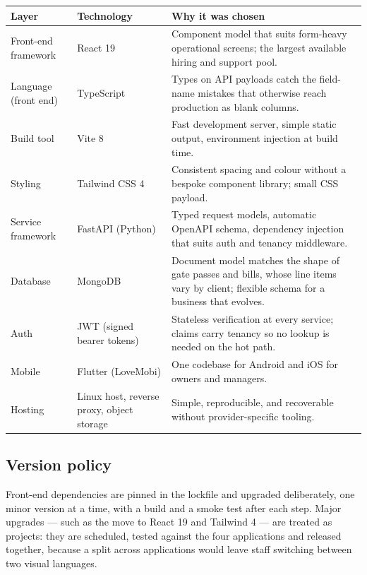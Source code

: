\documentclass[11pt,a4paper,oneside]{book}
\begin{document}
\begin{center}\small
\begin{tabularx}{\linewidth}{|X|X|X|}
\hline
\rowcolor{lightgrey}
\textbf{Layer} & \textbf{Technology} & \textbf{Why it was chosen} \\ \hline
Front-end framework & React 19 & Component model that suits form-heavy operational screens; the largest available hiring and support pool. \\ \hline
Language (front end) & TypeScript & Types on API payloads catch the field-name mistakes that otherwise reach production as blank columns. \\ \hline
Build tool & Vite 8 & Fast development server, simple static output, environment injection at build time. \\ \hline
Styling & Tailwind CSS 4 & Consistent spacing and colour without a bespoke component library; small CSS payload. \\ \hline
Service framework & FastAPI (Python) & Typed request models, automatic OpenAPI schema, dependency injection that suits auth and tenancy middleware. \\ \hline
Database & MongoDB & Document model matches the shape of gate passes and bills, whose line items vary by client; flexible schema for a business that evolves. \\ \hline
Auth & JWT (signed bearer tokens) & Stateless verification at every service; claims carry tenancy so no lookup is needed on the hot path. \\ \hline
Mobile & Flutter (LoveMobi) & One codebase for Android and iOS for owners and managers. \\ \hline
Hosting & Linux host, reverse proxy, object storage & Simple, reproducible, and recoverable without provider-specific tooling. \\ \hline
\end{tabularx}
\end{center}
\subsection*{Version policy}
Front-end dependencies are pinned in the lockfile and upgraded deliberately, one minor version at a time, with a build and a smoke test after each step. Major upgrades — such as the move to React 19 and Tailwind 4 — are treated as projects: they are scheduled, tested against the four applications and released together, because a split across applications would leave staff switching between two visual languages.
\end{document}
